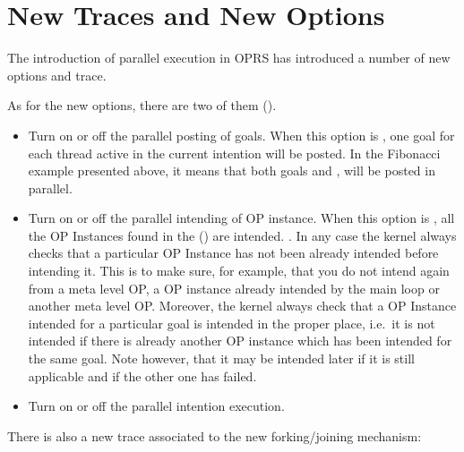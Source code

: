\section{New Traces and New Options}

The introduction of parallel execution in OPRS has introduced a number of new
options and trace.

As for the new options, there are two of them (). 

\begin{itemize}

\item {} Turn on or off the parallel posting of goals.
When this option is , one goal for each thread active in the current
intention will be posted. In the Fibonacci example presented above, it means
that both goals  and , will be posted in parallel.

\item {} Turn on or off the parallel intending of
OP instance. When this option is , all the OP Instances found in the
 () are intended.
. In any case the kernel always checks that a particular
OP Instance has not been already intended before intending it. This is to make
sure, for example, that you do not intend again from a meta level OP, a OP
instance already intended by the main loop or another meta level OP. Moreover,
the kernel always check that a OP Instance intended for a particular goal is
intended in the proper place, i.e.\ it is not intended if there is already
another OP instance which has been intended for the same goal. Note however,
that it may be intended later if it is still applicable and if the other one
has failed.

\item {} Turn on or off the parallel
intention execution.

\end{itemize}

There is also a new trace associated to the new forking/joining mechanism:

